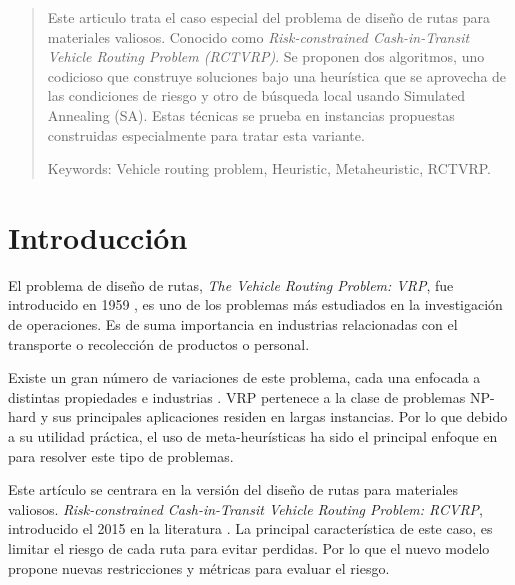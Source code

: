 \documentclass[conference]{IEEEtran}
\begin{document}
\begin{abstract}
Este articulo trata el caso especial del problema de diseño de rutas para materiales valiosos. Conocido como \textit{Risk-constrained Cash-in-Transit Vehicle
Routing Problem (RCTVRP)}. Se proponen dos algoritmos, uno codicioso que construye soluciones bajo una heurística que se aprovecha de las condiciones de riesgo y otro de búsqueda local usando Simulated Annealing (SA). Estas técnicas se prueba en instancias propuestas construidas especialmente para tratar esta variante.

Keywords: Vehicle routing problem, Heuristic, Metaheuristic, RCTVRP.
\end{abstract}





%
\IEEEpeerreviewmaketitle



\section{Introducción}

El problema de diseño de rutas, \textit{The Vehicle Routing Problem: VRP}, fue introducido en 1959 \cite{vrp}, es uno de los problemas más estudiados en la investigación de operaciones. Es de suma importancia en industrias relacionadas con el transporte o recolección de productos o personal. 

Existe un gran número de variaciones de este problema, cada una enfocada a distintas propiedades e industrias \cite{taxonomic}. VRP pertenece a la clase de problemas NP-hard y sus principales aplicaciones residen en largas instancias. Por lo que debido a su utilidad práctica, el uso de meta-heurísticas ha sido el principal enfoque en para resolver este tipo de problemas\cite{BRAEKERS2016300}.  


Este artículo se centrara en la versión del diseño de rutas para materiales valiosos. \textit{Risk-constrained Cash-in-Transit Vehicle Routing Problem: RCVRP}, introducido el 2015 en la literatura \cite{TALARICO2015457}. La principal característica de este caso, es limitar el riesgo de cada ruta para evitar perdidas. Por lo que el nuevo modelo propone nuevas restricciones y métricas para evaluar el riesgo. 
\end{document}
